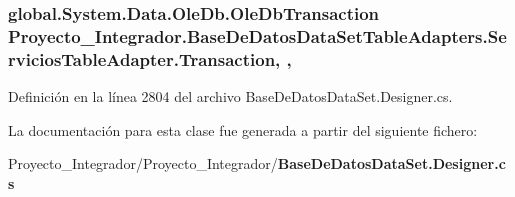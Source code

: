\subsubsection[{Transaction}]{\setlength{\rightskip}{0pt plus 5cm}global.\-System.\-Data.\-Ole\-Db.\-Ole\-Db\-Transaction Proyecto\-\_\-\-Integrador.\-Base\-De\-Datos\-Data\-Set\-Table\-Adapters.\-Servicios\-Table\-Adapter.\-Transaction\hspace{0.3cm}{\ttfamily [get]}, {\ttfamily [set]}, {\ttfamily [package]}}\label{class_proyecto___integrador_1_1_base_de_datos_data_set_table_adapters_1_1_servicios_table_adapter_a12c45568e119b9d8fdae452a31cc03b5}


Definición en la línea 2804 del archivo Base\-De\-Datos\-Data\-Set.\-Designer.\-cs.



La documentación para esta clase fue generada a partir del siguiente fichero\-:\begin{DoxyCompactItemize}
\item 
Proyecto\-\_\-\-Integrador/\-Proyecto\-\_\-\-Integrador/{\bf Base\-De\-Datos\-Data\-Set.\-Designer.\-cs}\end{DoxyCompactItemize}
